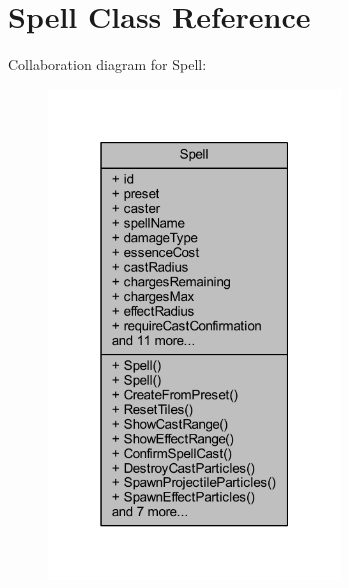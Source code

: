 \hypertarget{class_spell}{}\section{Spell Class Reference}
\label{class_spell}


Collaboration diagram for Spell\+:
\nopagebreak
\begin{figure}[H]
\begin{center}
\leavevmode
\includegraphics[width=220pt]{class_spell__coll__graph}
\end{center}
\end{figure}
